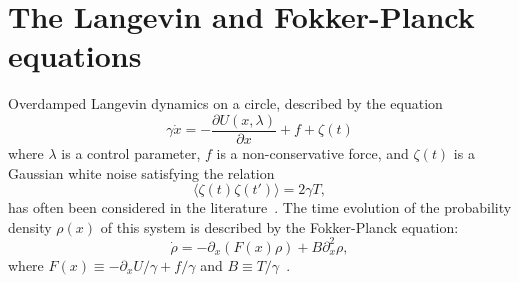 \documentclass[aps,pre,amsmath,amssymb,floatfix,preprint,nofootinbib]{revtex4}
\begin{document}
\section{The Langevin and Fokker-Planck equations}\label{lang}
 Overdamped Langevin dynamics on a circle, described by the equation
\begin{equation}
\gamma \dot x = -\frac{\partial U(x,\lambda)}{\partial x} + f + \zeta(t)\label{lg}
\end{equation}
where $\lambda$ is a control parameter, $f$ is a non-conservative force, and  $\zeta(t)$ is a Gaussian white noise satisfying the relation
\begin{equation}
\langle \zeta(t) \zeta(t')\rangle = 2 \gamma T,
\end{equation}
has often been considered in the literature~\cite{seif1,seif2,hs,sp,hy2}. 
The time evolution of the probability density $\rho(x)$ of this system is described by the  Fokker-Planck equation:
\begin{equation}
\dot \rho = -\partial_x (F(x) \rho) +  B \partial_x^2 \rho, \label{fp}
\end{equation} 
where $F(x) \equiv -\partial_x U/\gamma+f/\gamma$ and $B \equiv T/ \gamma$~\cite{zwan}. 
\end{document}
